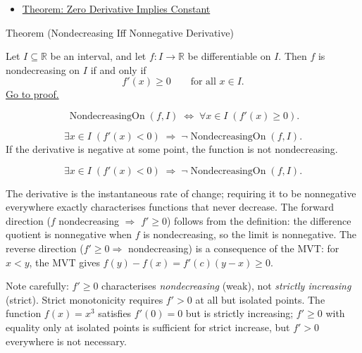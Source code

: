 \begin{dependencies}
\begin{itemize}
  \item \hyperref[thm:zero-derivative-implies-constant]{Theorem: Zero Derivative Implies Constant}
\end{itemize}
\end{dependencies}


\begin{theorembox}{Theorem (Nondecreasing Iff Nonnegative Derivative)}
\begin{theorem}
\label{thm:nondecreasing-iff-nonneg-derivative}
Let $I \subseteq \mathbb{R}$ be an interval, and let $f : I \to \mathbb{R}$ be differentiable on $I$. Then $f$ is nondecreasing on $I$ if and only if
\[
f'(x) \geq 0 \qquad \text{for all } x \in I.
\]
\hyperref[prf:nondecreasing-iff-nonneg-derivative]{Go to proof.}
\end{theorem}
\end{theorembox}

\begin{remark*}
\[
\operatorname{NondecreasingOn}(f,I)
\;\iff\;
\forall x \in I\;(f'(x) \geq 0).
\]
\end{remark*}

\begin{remark*}
\[
\exists x \in I\;(f'(x) < 0)
\;\Rightarrow\;
\lnot\operatorname{NondecreasingOn}(f,I).
\]
If the derivative is negative at some point, the function is not nondecreasing.
\end{remark*}

\begin{remark*}
\[
\exists x \in I\;(f'(x) < 0) \;\Rightarrow\; \lnot\operatorname{NondecreasingOn}(f,I).
\]
\end{remark*}

\begin{remark*}[Interpretation]
The derivative is the instantaneous rate of change; requiring it to be nonnegative everywhere exactly characterises functions that never decrease. The forward direction ($f$ nondecreasing $\Rightarrow$ $f' \geq 0$) follows from the definition: the difference quotient is nonnegative when $f$ is nondecreasing, so the limit is nonnegative. The reverse direction ($f' \geq 0 \Rightarrow$ nondecreasing) is a consequence of the MVT: for $x < y$, the MVT gives $f(y)-f(x) = f'(c)(y-x) \geq 0$.

Note carefully: $f' \geq 0$ characterises \emph{nondecreasing} (weak), not \emph{strictly increasing} (strict). Strict monotonicity requires $f' > 0$ at all but isolated points. The function $f(x) = x^3$ satisfies $f'(0) = 0$ but is strictly increasing; $f' \geq 0$ with equality only at isolated points is sufficient for strict increase, but $f' > 0$ everywhere is not necessary.
\end{remark*}

